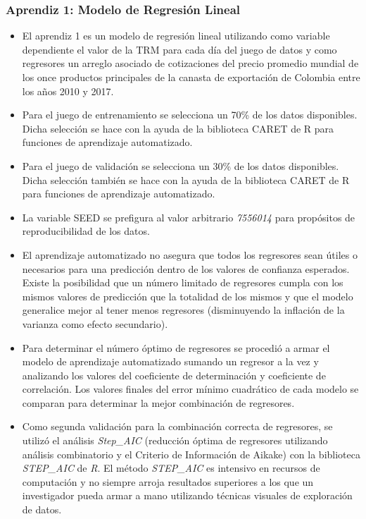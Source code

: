 \begin{spacing}{1.5}
\subsubsection{Aprendiz 1: Modelo de Regresión Lineal}
\begin{itemize}
	\item El aprendiz 1 es un modelo de regresión lineal utilizando como variable dependiente el valor de la TRM para cada día del juego de datos y como regresores un arreglo asociado de cotizaciones del precio promedio mundial de los once productos principales de la canasta de exportación de Colombia entre los años 2010 y 2017.
	\item Para el juego de entrenamiento se selecciona un 70\% de los datos disponibles. Dicha selección se hace con la ayuda de la biblioteca CARET de R para funciones de aprendizaje automatizado. 
	\item Para el juego de validación se selecciona un 30\% de los datos disponibles. Dicha selección también se hace con la ayuda de la biblioteca CARET de R para funciones de aprendizaje automatizado. 
	\item La variable SEED se prefigura al valor arbitrario \emph{7556014} para propósitos de reproducibilidad de los datos. 
	\item El aprendizaje automatizado no asegura que todos los regresores sean útiles o necesarios para una predicción dentro de los valores de confianza esperados. Existe la posibilidad que un número limitado de regresores cumpla con los mismos valores de predicción que la totalidad de los mismos y que el modelo generalice mejor al tener menos regresores (disminuyendo la inflación de la varianza como efecto secundario). 
	\item Para determinar el número óptimo de regresores se procedió a armar el modelo de aprendizaje automatizado sumando un regresor a la vez y analizando los valores del coeficiente de determinación y coeficiente de correlación. Los valores finales del error mínimo cuadrático de cada modelo se comparan para determinar la mejor combinación de regresores. 
	\item Como segunda validación para la combinación correcta de regresores, se utilizó el análisis \emph{Step\_AIC} (reducción óptima de regresores utilizando análisis combinatorio y el Criterio de Información de Aikake) con la biblioteca \emph{STEP\_AIC} de \emph{R}. El método \emph{STEP\_AIC} es intensivo en recursos de computación y no siempre arroja resultados superiores a los que un investigador pueda armar a mano utilizando técnicas visuales de exploración de datos.
\end{itemize}


\end{spacing}
